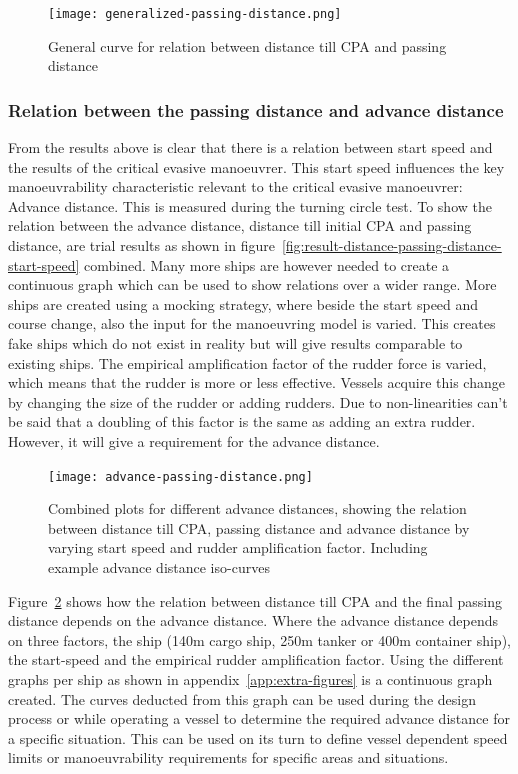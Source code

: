 \begin{figure}[hp]
	\centering
	\texttt{[image: generalized-passing-distance.png]}
	\caption{General curve for relation between distance till CPA and passing distance}
	\label{fig:general-advance-passing} 
\end{figure}

\subsubsection{Relation between the passing distance and advance distance}
\label{sec:relation-advance-distance}
From the results above is clear that there is a relation between start speed and the results of the critical evasive manoeuvrer. This start speed influences the key manoeuvrability characteristic relevant to the critical evasive manoeuvrer: Advance distance. This is measured during the turning circle test. To show the relation between the advance distance, distance till initial CPA and passing distance, are trial results as shown in figure~\ref{fig:result-distance-passing-distance-start-speed} combined. Many more ships are however needed to create a continuous graph which can be used to show relations over a wider range. More ships are created using a mocking strategy, where beside the start speed and course change, also the input for the manoeuvring model is varied. This creates fake ships which do not exist in reality but will give results comparable to existing ships. The empirical amplification factor of the rudder force is varied, which means that the rudder is more or less effective. Vessels acquire this change by changing the size of the rudder or adding rudders. Due to non-linearities can't be said that a doubling of this factor is the same as adding an extra rudder. However, it will give a requirement for the advance distance. 

\begin{figure}[p]
	\centering
	\texttt{[image: advance-passing-distance.png]}
	\caption{Combined plots for different advance distances, showing the relation between distance till CPA, passing distance and advance distance by varying start speed and rudder amplification factor. Including example advance distance iso-curves}
	\label{fig:passing-distance-advance}
\end{figure}

Figure~\ref{fig:passing-distance-advance} shows how the relation between distance till CPA and the final passing distance depends on the advance distance. Where the advance distance depends on three factors, the ship (140m cargo ship, 250m tanker or 400m container ship), the start-speed and the empirical rudder amplification factor. Using the different graphs per ship as shown in appendix~\ref{app:extra-figures} is a continuous graph created. The curves deducted from this graph can be used during the design process or while operating a vessel to determine the required advance distance for a specific situation. This can be used on its turn to define vessel dependent speed limits or manoeuvrability requirements for specific areas and situations.

